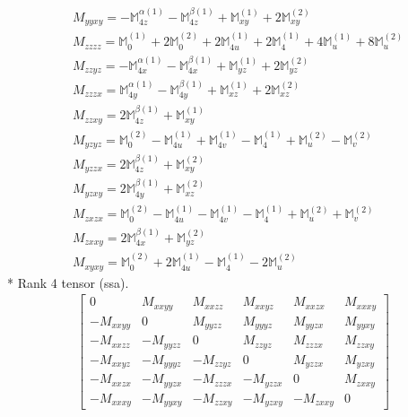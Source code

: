 \documentclass[fleqn,8pt,landscape]{jsarticle}
\begin{document}
\begin{align*}
& M_{yyxy} = - \mathbb{M}_{4z}^{\alpha(1)} - \mathbb{M}_{4z}^{\beta(1)} + \mathbb{M}_{xy}^{(1)} + 2 \mathbb{M}_{xy}^{(2)} \\
& M_{zzzz} = \mathbb{M}_{0}^{(1)} + 2 \mathbb{M}_{0}^{(2)} + 2 \mathbb{M}_{4u}^{(1)} + 2 \mathbb{M}_{4}^{(1)} + 4 \mathbb{M}_{u}^{(1)} + 8 \mathbb{M}_{u}^{(2)} \\
& M_{zzyz} = - \mathbb{M}_{4x}^{\alpha(1)} - \mathbb{M}_{4x}^{\beta(1)} + \mathbb{M}_{yz}^{(1)} + 2 \mathbb{M}_{yz}^{(2)} \\
& M_{zzzx} = \mathbb{M}_{4y}^{\alpha(1)} - \mathbb{M}_{4y}^{\beta(1)} + \mathbb{M}_{xz}^{(1)} + 2 \mathbb{M}_{xz}^{(2)} \\
& M_{zzxy} = 2 \mathbb{M}_{4z}^{\beta(1)} + \mathbb{M}_{xy}^{(1)} \\
& M_{yzyz} = \mathbb{M}_{0}^{(2)} - \mathbb{M}_{4u}^{(1)} + \mathbb{M}_{4v}^{(1)} - \mathbb{M}_{4}^{(1)} + \mathbb{M}_{u}^{(2)} - \mathbb{M}_{v}^{(2)} \\
& M_{yzzx} = 2 \mathbb{M}_{4z}^{\beta(1)} + \mathbb{M}_{xy}^{(2)} \\
& M_{yzxy} = 2 \mathbb{M}_{4y}^{\beta(1)} + \mathbb{M}_{xz}^{(2)} \\
& M_{zxzx} = \mathbb{M}_{0}^{(2)} - \mathbb{M}_{4u}^{(1)} - \mathbb{M}_{4v}^{(1)} - \mathbb{M}_{4}^{(1)} + \mathbb{M}_{u}^{(2)} + \mathbb{M}_{v}^{(2)} \\
& M_{zxxy} = 2 \mathbb{M}_{4x}^{\beta(1)} + \mathbb{M}_{yz}^{(2)} \\
& M_{xyxy} = \mathbb{M}_{0}^{(2)} + 2 \mathbb{M}_{4u}^{(1)} - \mathbb{M}_{4}^{(1)} - 2 \mathbb{M}_{u}^{(2)}
\end{align*}
* Rank 4 tensor (ssa).
\begin{align*}
\begin{bmatrix} 0 & M_{xxyy} & M_{xxzz} & M_{xxyz} & M_{xxzx} & M_{xxxy} \\ - M_{xxyy} & 0 & M_{yyzz} & M_{yyyz} & M_{yyzx} & M_{yyxy} \\ - M_{xxzz} & - M_{yyzz} & 0 & M_{zzyz} & M_{zzzx} & M_{zzxy} \\ - M_{xxyz} & - M_{yyyz} & - M_{zzyz} & 0 & M_{yzzx} & M_{yzxy} \\ - M_{xxzx} & - M_{yyzx} & - M_{zzzx} & - M_{yzzx} & 0 & M_{zxxy} \\ - M_{xxxy} & - M_{yyxy} & - M_{zzxy} & - M_{yzxy} & - M_{zxxy} & 0 \end{bmatrix}
\end{align*}
\end{document}
